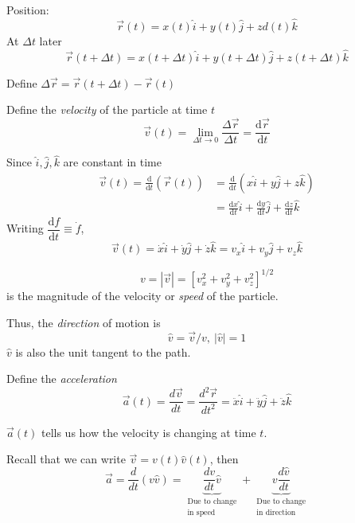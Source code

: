 \documentclass[10pt]{scrartcl}
\begin{document}
\setlength{\jot}{8pt}%

Position: 
\[\vec{r}(t) = x(t)\hat{i} + y(t)\hat{j} + zd(t)\hat{k}\]
At $\Delta t$ later
\[\vec{r}(t + \Delta t) = x(t + \Delta t)\hat{i} + y(t + \Delta t)\hat{j} + z(t + \Delta t)\hat{k}\]

\begin{definition}
Define $\Delta \vec{r} = \vec{r}(t + \Delta t) - \vec{r}(t)$

Define the \emph{velocity} of the particle at time $t$
\[\vec{v}(t) = \lim_{\Delta t \to 0} \frac{\Delta \vec{r}}{\Delta t} = \frac{\mathrm{d}\vec{r}}{\mathrm{d}t}\]
\end{definition}

Since $\hat{i},\hat{j},\hat{k}$ are constant in time
\[\begin{aligned}
	\vec{v}(t) = \frac{\mathrm{d}}{\mathrm{d}t}(\vec{r}(t)) &= \frac{\mathrm{d}}{\mathrm{d}t}(x \hat{i} + y\hat{j} + z\hat{k})\\
	&= \frac{\mathrm{d}x}{\mathrm{d}t}\hat{i} + \frac{\mathrm{d}y}{\mathrm{d}t}\hat{j} + \frac{\mathrm{d}z}{\mathrm{d}t}\hat{k}
\end{aligned}
\]
Writing $\dfrac{\mathrm{d}f}{\mathrm{d}t} \equiv \dot{f}$, \[\vec{v}(t) = \dot{x}\hat{i} + \dot{y}\hat{j} + \dot{z}\hat{k} = v_x\hat{i} + v_y\hat{j} + v_z\hat{k}\]

\begin{definition}
\[v = |\vec{v}| = [v_x^2 + v_y^2 + v_z^2]^{1/2}\]
is the magnitude of the velocity or \emph{speed} of the particle.

Thus, the \emph{direction} of motion is 
\[\hat{v} = \vec{v}/v,~ |\hat{v}| = 1\]
$\hat{v}$ is also the unit tangent to the path.

Define the \emph{acceleration}
\[\vec{a}(t) = \frac{d\vec{v}}{dt} = \frac{d^2\vec{r}}{dt^2} = \ddot{x}\hat{i} + \ddot{y}\hat{j} + \ddot{z}\hat{k}\]
\end{definition}

$\vec{a}(t)$ tells us how the velocity is changing at time $t$. 

Recall that we can write $\vec{v} = v(t)\hat{v}(t)$, then
\[\vec{a} = \frac{d}{dt}(v\hat{v}) = \underbrace{\frac{dv}{dt}\hat{v}}_{\substack{\text{Due to change}\\ \text{in speed}}} + \underbrace{v\frac{d\hat{v}}{dt}}_{\substack{\text{Due to change}\\ \text{in direction}}}\]

\end{document}
